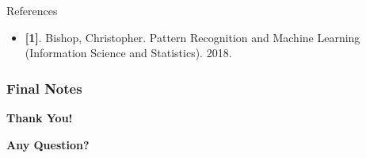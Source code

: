 \documentclass[compress,oilve]{beamer}
\begin{document}






\begin{frame}{References}
\begin{itemize}
\item{} \textbf{[1]}. Bishop, Christopher. Pattern Recognition and Machine Learning (Information Science and Statistics). 2018.
\end{itemize}
\end{frame}



\frametitle{Final Notes}
\centering
\vspace{50 pt}
\textbf{Thank You!}
\vspace{50pt}

\textbf{Any Question?}
\end{document}
